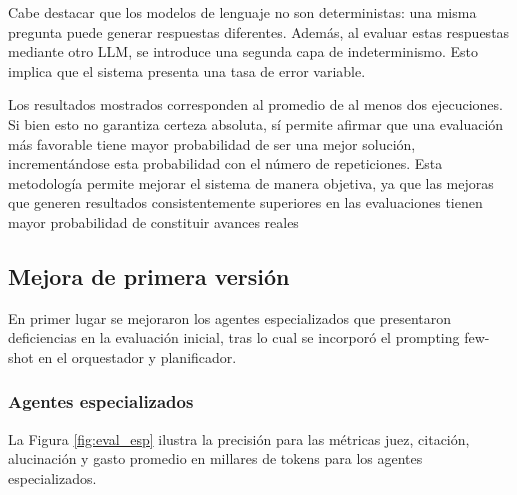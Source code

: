 Cabe destacar que los modelos de lenguaje no son deterministas: una misma pregunta puede generar respuestas diferentes. Además, al evaluar estas respuestas mediante otro LLM, se introduce una segunda capa de indeterminismo. Esto implica que el sistema presenta una tasa de error variable.

Los resultados mostrados corresponden al promedio de al menos dos ejecuciones. Si bien esto no garantiza certeza absoluta, sí permite afirmar que una evaluación más favorable tiene mayor probabilidad de ser una mejor solución, incrementándose esta probabilidad con el número de repeticiones. Esta metodología permite mejorar el sistema de manera objetiva, ya que las mejoras que generen resultados consistentemente superiores en las evaluaciones tienen mayor probabilidad de constituir avances reales

\subsection{Mejora de primera versión}
En primer lugar se mejoraron los agentes especializados que presentaron deficiencias en la evaluación inicial, tras lo cual se incorporó el prompting few-shot en el orquestador y planificador.

\subsubsection{Agentes especializados}
La Figura \ref{fig:eval_esp} ilustra la precisión para las métricas juez, citación, alucinación y gasto promedio en millares de tokens para los agentes especializados.

